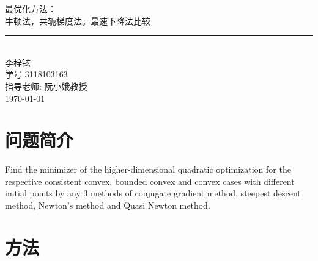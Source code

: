 \documentclass[UTF8]{ctexart}
\newcommand{\labtitle}{牛顿法，共轭梯度法。最速下降法比较}
\newcommand{\authorname}{李梓铉}
\newcommand{\professor}{阮小娥教授}
\newcommand{\classno}{3118103163}
\begin{document}


\begin{titlepage}
\begin{center}
{\LARGE \textsc{最优化方法：} \\ \vspace{4pt}}
{\Large \textsc{\labtitle} \\ \vspace{4pt}}
\rule[13pt]{\textwidth}{1pt} \\ \vspace{150pt}
{\large  \authorname \\ \vspace{10pt}
学号 \classno\\ \vspace{10pt}
指导老师: \professor \\ \vspace{10pt}
\today}
\end{center}
\end{titlepage}





\section{问题简介}
Find the minimizer of the higher-dimensional quadratic optimization for  the respective consistent convex, bounded convex and convex  cases with different initial points by any 3 methods of conjugate gradient method, steepest descent method, Newton’s method and Quasi Newton method.

\section{方法}
\end{document}
